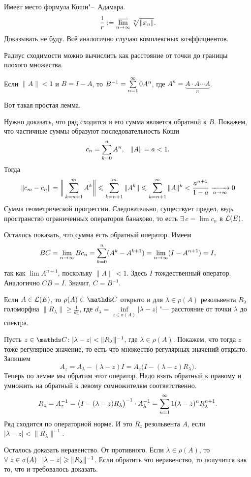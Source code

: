 Имеет место формула Коши"--~Адамара.
\[
  \frac1r:= \varlimsup\limits_{n\to\infty} \sqrt[n]{\|x_n\|}.
\]
Доказывать не буду. Всё аналогично случаю комплексных коэффициентов.

Радиус сходимости можно вычислить как расстояние от точки до границы плохого множества.


\begin{Lem}
 Если $\|A\|<1$ и $B = I-A$, то $B^{-1} = \rY n0 A^n$, где $A^n = \underbrace{A\cdot A\cdots A}_{n}$.
\end{Lem}
Вот такая простая лемма.
\begin{Proof}
  Нужно доказать, что ряд сходится и его сумма является обратной к $B$. Покажем, что частичные суммы образуют последовательность Коши
\[
  c_n = \RY k0n A^n,\pau \|A\|=a<1.
\]
Тогда
\[
  \|c_m-c_n\| = \bigg\|\RY k{n+1}m A^k\bigg\|\le \RY k{n+1}m\|A^k\|\le
  \RY k{n+1}m\|A\|^k<\frac{a^{n+1}}{1-a}\te 0
\]
Сумма геометрической прогрессии. Следовательно, существует предел, ведь пространство ограниченных операторов банахово, то есть $\exists\ c = \lim c_n$ в $\L(E)$.

Осталось показать, что сумма есть обратный оператор. Имеем
\[
  BC = \yo n\infty Bc_n = \RY k0n(A^k-A^{k+1})=
  \lim\limits_{n\to\infty} (I-A^{n+1}) = I,
\]
так как $\lim A^{n+1}$, поскольку $\|A\|<1$. Здесь $I$ тождественный оператор. Аналогично $CB = I$. Значит, $C = B^{-1}$.
\end{Proof}

\begin{The}[о резольвенте]
  Если $A\in\L(E)$, то $\rho(A)\subset \C$ открыто и для $\lambda\in\rho(A)$ резольвента $R_\lambda$ голоморфна $\|R_\lambda\|\ge\frac1{d_\lambda}$, где
$ d_\lambda = \inf\limits_{z\in \sigma(A)}|\lambda-z|$ "--- расстояние от точки $\lambda$ до спектра.
\end{The}
\begin{Proof}
  Пусть $z\in \C\colon |\lambda-z|<\|R_\lambda\|^{-1}$, где
  $\lambda\in\rho(A)$. Покажем, что тогда $z$ тоже регулярное значение, то есть что множество регулярных значений открыто. Запишем
  \[
    A_z = A_\lambda - (\lambda - z) I = A_z\big(I-(\lambda-z)R_\lambda\big).
  \]
Теперь по лемме мы обратим этот оператор. Надо взять обратный к правому и умножить на обратный к левому сомножителям соответственно.
\[
  R_z = A^{-1}_z = \big(I-(\lambda-z)R_\lambda\big)^{-1} \cdot A^{-1}_\lambda = \rY n1(\lambda-z)^nR_\lambda^{n+1}.
\]
Ряд сходится по операторной норме. И это $R_z$ резольвента $A$, если $|\lambda-z|<\|R_\lambda\|^{-1}$.

Осталось доказать неравенство. От противного. Если $\lambda\in\rho(A)$, то $\forall\ z\in \sigma(A)\pau |\lambda-z|\ge \|R_\lambda\|^{-1} $. Если обратить это неравенство, то получится как то, что и требовалось доказать.
\end{Proof}

